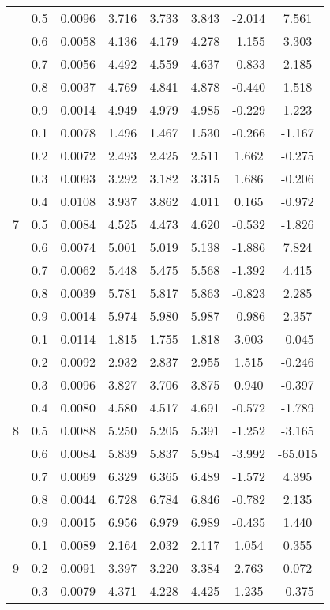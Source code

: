 \documentclass[11pt,a4paper]{report}
\begin{document}
\begin{longtable}{ | c | c || c | c | c | c | c | c | }
 & 0.5 & 0.0096 & 3.716 & 3.733 & 3.843 & -2.014 & 7.561 \\
 & 0.6 & 0.0058 & 4.136 & 4.179 & 4.278 & -1.155 & 3.303 \\
 & 0.7 & 0.0056 & 4.492 & 4.559 & 4.637 & -0.833 & 2.185 \\
 & 0.8 & 0.0037 & 4.769 & 4.841 & 4.878 & -0.440 & 1.518 \\
 & 0.9 & 0.0014 & 4.949 & 4.979 & 4.985 & -0.229 & 1.223 \\
 \hline
\multirow{9}{*}{7} & 0.1 & 0.0078 & 1.496 & 1.467 & 1.530 & -0.266 & -1.167 \\
 & 0.2 & 0.0072 & 2.493 & 2.425 & 2.511 & 1.662 & -0.275 \\
 & 0.3 & 0.0093 & 3.292 & 3.182 & 3.315 & 1.686 & -0.206 \\
 & 0.4 & 0.0108 & 3.937 & 3.862 & 4.011 & 0.165 & -0.972 \\
 & 0.5 & 0.0084 & 4.525 & 4.473 & 4.620 & -0.532 & -1.826 \\
 & 0.6 & 0.0074 & 5.001 & 5.019 & 5.138 & -1.886 & 7.824 \\
 & 0.7 & 0.0062 & 5.448 & 5.475 & 5.568 & -1.392 & 4.415 \\
 & 0.8 & 0.0039 & 5.781 & 5.817 & 5.863 & -0.823 & 2.285 \\
 & 0.9 & 0.0014 & 5.974 & 5.980 & 5.987 & -0.986 & 2.357 \\
 \hline
\multirow{9}{*}{8} & 0.1 & 0.0114 & 1.815 & 1.755 & 1.818 & 3.003 & -0.045 \\
 & 0.2 & 0.0092 & 2.932 & 2.837 & 2.955 & 1.515 & -0.246 \\
 & 0.3 & 0.0096 & 3.827 & 3.706 & 3.875 & 0.940 & -0.397 \\
 & 0.4 & 0.0080 & 4.580 & 4.517 & 4.691 & -0.572 & -1.789 \\
 & 0.5 & 0.0088 & 5.250 & 5.205 & 5.391 & -1.252 & -3.165 \\
 & 0.6 & 0.0084 & 5.839 & 5.837 & 5.984 & -3.992 & -65.015 \\
 & 0.7 & 0.0069 & 6.329 & 6.365 & 6.489 & -1.572 & 4.395 \\
 & 0.8 & 0.0044 & 6.728 & 6.784 & 6.846 & -0.782 & 2.135 \\
 & 0.9 & 0.0015 & 6.956 & 6.979 & 6.989 & -0.435 & 1.440 \\
 \hline
\multirow{9}{*}{9} & 0.1 & 0.0089 & 2.164 & 2.032 & 2.117 & 1.054 & 0.355 \\
 & 0.2 & 0.0091 & 3.397 & 3.220 & 3.384 & 2.763 & 0.072 \\
 & 0.3 & 0.0079 & 4.371 & 4.228 & 4.425 & 1.235 & -0.375 \\

\end{longtable}
\end{document}

